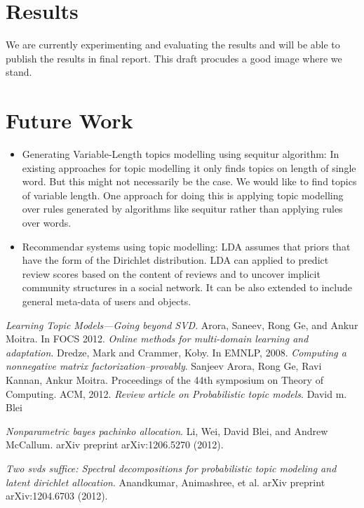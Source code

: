 \documentclass[a4paper,11pt]{article}
\begin{document}
\section{Results}
We are currently experimenting and evaluating the results and will be able to publish the results in final report. This draft procudes a good image where we stand. 

\section{Future Work}

\begin{itemize}

\item Generating Variable-Length topics modelling using sequitur algorithm:
	In existing approaches for topic modelling it only finds topics on length of single word. But this might not necessarily be the case. We would like to find topics of variable length. One approach for doing this is applying topic modelling over rules generated by algorithms like sequitur rather than applying rules over words.

\item Recommendar systems using topic modelling:
	LDA assumes that priors that have the form of the Dirichlet distribution. LDA can applied to predict review scores based on the content of reviews and to uncover implicit community structures in a social network. It can be also extended to include general meta-data of users and objects.

\end{itemize}


\begin{thebibliography}{99}
 \textit{Learning Topic Models---Going beyond SVD}. Arora, Saneev, Rong Ge, and Ankur Moitra. In FOCS 2012.
 \textit{Online methods for multi-domain learning and adaptation}. Dredze, Mark and Crammer, Koby. In
EMNLP, 2008.
 \textit{Computing a nonnegative matrix factorization--provably}. Sanjeev Arora, Rong Ge, Ravi Kannan, Ankur Moitra. Proceedings of the 44th symposium on Theory of Computing. ACM, 2012.  
 \textit{Review article on Probabilistic topic models}. David m. Blei  

 \textit{Nonparametric bayes pachinko allocation}. Li, Wei, David Blei, and Andrew McCallum. arXiv preprint arXiv:1206.5270 (2012). 

 \textit{Two svds suffice: Spectral decompositions for probabilistic topic modeling and latent dirichlet allocation}. Anandkumar, Animashree, et al.  arXiv preprint arXiv:1204.6703 (2012).



\end{thebibliography}

\pagebreak
\end{document}

